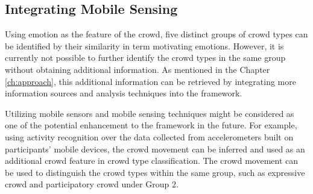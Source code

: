 \subsection{Integrating Mobile Sensing}
Using emotion as the feature of the crowd, five distinct groups of crowd types can be identified by their similarity in term motivating emotions. However, it is currently not possible to further identify the crowd types in the same group without obtaining additional information. As mentioned in the Chapter \ref{ch:approach}, this additional information can be retrieved by integrating more information sources and analysis techniques into the framework. 

Utilizing mobile sensors and mobile sensing techniques might be considered as one of the potential enhancement to the framework in the future. For example, using activity recognition over the data collected from accelerometers built on participants’ mobile devices, the crowd movement can be inferred and used as an additional crowd feature in crowd type classification. The crowd movement can be used to distinguish the crowd types within the same group, such as expressive crowd and participatory crowd under Group 2.
